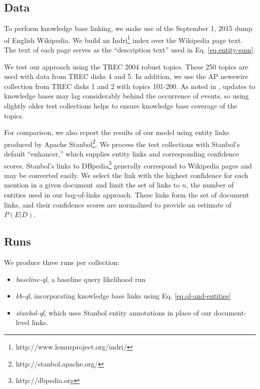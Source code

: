\documentclass{sig-alternate}
\begin{document}
\subsection{Data}\label{section.evaluation.collections}

To perform knowledge base linking, we make use of the September 1, 2015 dump of English Wikipedia. We build an Indri\footnote{http://www.lemurproject.org/indri/} index over the Wikipedia page text. The text of each page serves as the ``description text'' used in Eq. \ref{eq.entity-sum}.

We test our approach using the TREC 2004 robust topics. These 250 topics are used with data from TREC disks 4 and 5. In addition, we use the AP newswire collection from TREC disks 1 and 2 with topics 101-200. As noted in \cite{Frank2013}, updates to knowledge bases may lag considerably behind the occurrence of events, so using slightly older test collections helps to ensure knowledge base coverage of the topics.

For comparison, we also report the results of our model using entity links produced by Apache Stanbol\footnote{http://stanbol.apache.org/}. We process the test collections with Stanbol's default ``enhancer,'' which supplies entity links and corresponding confidence scores. Stanbol's links to DBpedia\footnote{http://dbpedia.org} generally correspond to Wikipedia pages and may be converted easily. We select the link with the highest confidence for each mention in a given document and limit the set of links to $n$, the number of entities used in our bag-of-links approach. These links form the set of document links, and their confidence scores are normalized to provide an estimate of $P(E|D)$.

\subsection{Runs}\label{section.evaluation.runs}


We produce three runs per collection:
\begin{itemize}
	\item \textit{baseline-ql}, a baseline query likelihood run
	\item \textit{kb-ql}, incorporating knowledge base links using Eq. \ref{eq.ql-and-entities}
	\item \textit{stanbol-ql}, which uses Stanbol entity annotations in place of our document-level links.
\end{itemize}
\end{document}
